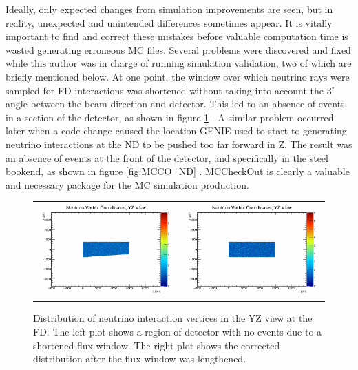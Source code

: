 Ideally, only expected changes from simulation improvements are seen, but in reality, unexpected and unintended differences sometimes appear. It is vitally important to find and correct these mistakes before valuable computation time is wasted generating erroneous MC files. Several problems were discovered and fixed while this author was in charge of running simulation validation, two of which are briefly mentioned below. At one point, the window over which neutrino rays were sampled for FD interactions was shortened without taking into account the $3^\circ$ angle between the beam direction and detector. This led to an absence of events in a section of the detector, as shown in figure \ref{fig:MCCO_FD} \cite{ref:MCCO_FDFix}. A similar problem occurred later when a code change caused the location GENIE used to start to generating neutrino interactions at the ND to be pushed too far forward in Z. The result was an absence of events at the front of the detector, and specifically in the steel bookend, as shown in figure \ref{fig:MCCO_ND} \cite{ref:MCCO_NDFix}. MCCheckOut is clearly a valuable and necessary package for the MC simulation production.
\begin{figure}[htb]
  \centering
  \begin{tabular}{c c}
    \includegraphics[width=.47\textwidth]{figures/MCCO_FDWrong.png} &
    \includegraphics[width=.47\textwidth]{figures/MCCO_FDRight.png} \\
  \end{tabular}
  \caption[Identifying Missing Simulated Events in the FD]{Distribution of neutrino interaction vertices in the YZ view at the FD. The left plot shows a region of detector with no events due to a shortened flux window. The right plot shows the corrected distribution after the flux window was lengthened.}
  \label{fig:MCCO_FD}
\end{figure}

